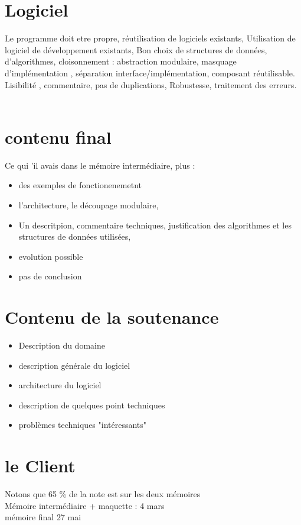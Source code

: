 \documentclass{article}
\begin{document}
\section{Logiciel} Le programme doit etre propre, réutilisation de logiciels existants, Utilisation de logiciel de développement existants, Bon choix de structures de données, d'algorithmes, cloisonnement : abstraction modulaire, masquage d’implémentation , séparation interface/implémentation, composant réutilisable. Lisibilité , commentaire, pas de duplications, Robustesse, traitement des erreurs.\\\\
\section{contenu final} Ce qui 'il avais dans le mémoire intermédiaire, plus : 
\begin{itemize}
\item des exemples de fonctionenemetnt
\item l'architecture, le découpage modulaire,
\item Un descritpion, commentaire techniques, justification des algorithmes et les structures de données utilisées, 
\item evolution possible
\item pas de conclusion 
\end{itemize}  
\section{Contenu de la soutenance}
\begin{itemize}
\item Description du domaine
\item description générale du logiciel
\item architecture du logiciel
\item description de quelques point techniques
\item problèmes techniques "intéressants"
\end{itemize}
\section{le Client}
Notons que 65 \% de la note est sur les deux mémoires\\Mémoire intermédiaire  + maquette : 4 mars\\ mémoire final 27 mai 
\end{document}

